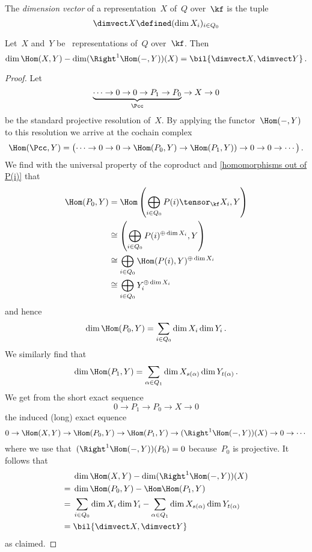 \begin{definition*}
  The \emph{dimension vector} of a {\fd} representation~$X$ of~$Q$ over~$\kf$ is the tuple
  \[
    \dimvect X
    \defined
    (\dim X_i)_{i \in Q_0}
  \]
\end{definition*}


\begin{corollary}
  Let~$X$ and~$Y$ be~{\fd} representations of~$Q$ over~$\kf$.
  Then
  \[
    \dim \Hom(X,Y)
    -
    \dim (\Right^1 \Hom(-,Y))(X)
    =
    \bil{\dimvect X, \dimvect Y}  \,.
  \]
\end{corollary}


\begin{proof}
  Let
  \[
    \underbrace{
    \dotsb
    \to
    0
    \to
    0
    \to
    P_1
    \to
    P_0
    }_{\Pcc}
    \to
    X
    \to
    0
  \]
  be the standard projective resolution of~$X$.
  By applying the functor~$\Hom(-,Y)$ to this resolution we arrive at the cochain complex
  \[
    \Hom(\Pcc, Y)
    =
    \bigl(
      \dotsb
      \to
      0
      \to
      0
      \to
      \Hom(P_0, Y)
      \to
      \Hom(P_1, Y))
      \to
      0
      \to
      0
      \to
      \dotsb
    \bigr)  \,.
  \]
  We find with the universal property of the coproduct and \cref{homomorphisms out of P(i)} that
  \begin{align*}
    \Hom(P_0, Y)
    &=
    \Hom
    \left(
      \bigoplus_{i \in Q_0}
      P(i) \tensor_\kf X_i,
      Y
    \right)
    \\
    &\cong
    \left(
      \bigoplus_{i \in Q_0}
      P(i)^{\oplus \dim X_i},
      Y
    \right)
    \\
    &\cong
    \bigoplus_{i \in Q_0}
    \Hom( P(i), Y )^{\oplus \dim X_i}
    \\
    &\cong
    \bigoplus_{i \in Q_0}
    Y_i^{\oplus \dim X_i}
  \end{align*}
  and hence
  \[
    \dim \Hom(P_0, Y)
    =
    \sum_{i \in Q_0} \dim X_i \dim Y_i  \,.
  \]
  We similarly find that
  \[
    \dim \Hom(P_1, Y)
    =
    \sum_{\alpha \in Q_1}
    \dim X_{s(\alpha)} \dim Y_{t(\alpha)} \,.
  \]
  We get from the short exact sequence
  \[
    0
    \to
    P_1
    \to
    P_0
    \to
    X
    \to
    0
  \]
  the induced (long) exact equence
  \[
    0
    \to
    \Hom(X,Y)
    \to
    \Hom(P_0,Y)
    \to
    \Hom(P_1,Y)
    \to
    (\Right^1 \Hom(-,Y))(X)
    \to
    0
    \to
    \dotsb
  \]
  where we use that~$(\Right^1 \Hom(-,Y))(P_0) = 0$ because~$P_0$ is projective.
  It follows that
  \begin{align*}
    {}&
      \dim \Hom(X,Y)
    - \dim (\Right^1 \Hom(-,Y))(X)
    \\
    ={}&
      \dim \Hom(P_0, Y)
    - \Hom \Hom(P_1, Y)
    \\
    ={}&
      \sum_{i \in Q_0} \dim X_i \dim Y_i
    - \sum_{\alpha \in Q_1} \dim X_{s(\alpha)} \dim Y_{t(\alpha)}
    \\
    ={}&
      \bil{ \dimvect X, \dimvect Y }
  \end{align*}
  as claimed.
\end{proof}









